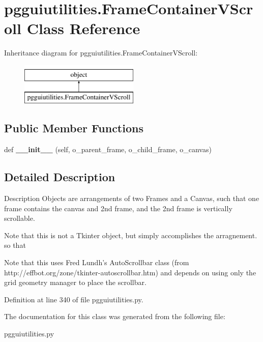 \hypertarget{classpgguiutilities_1_1FrameContainerVScroll}{}\section{pgguiutilities.\+Frame\+Container\+V\+Scroll Class Reference}
\label{classpgguiutilities_1_1FrameContainerVScroll}
Inheritance diagram for pgguiutilities.\+Frame\+Container\+V\+Scroll\+:\begin{figure}[H]
\begin{center}
\leavevmode
\includegraphics[height=2.000000cm]{classpgguiutilities_1_1FrameContainerVScroll}
\end{center}
\end{figure}
\subsection*{Public Member Functions}
\begin{DoxyCompactItemize}
\item 
def {\bfseries \+\_\+\+\_\+init\+\_\+\+\_\+} (self, o\+\_\+parent\+\_\+frame, o\+\_\+child\+\_\+frame, o\+\_\+canvas)\hypertarget{classpgguiutilities_1_1FrameContainerVScroll_a7e9c2478dcb2534f95e1977a82adf831}{}\label{classpgguiutilities_1_1FrameContainerVScroll_a7e9c2478dcb2534f95e1977a82adf831}

\end{DoxyCompactItemize}


\subsection{Detailed Description}
\begin{DoxyVerb}Description
Objects are arrangements of two Frames and a 
Canvas, such that one frame contains the 
canvas and 2nd frame, and the 2nd frame 
is vertically scrollable.

Note that this is not a Tkinter object, but
simply accomplishes the arragnement. so that

Note that this uses Fred Lundh's AutoScrollbar class
(from http://effbot.org/zone/tkinter-autoscrollbar.htm)
and depends on using only the grid geometry manager to place
the scrollbar.
\end{DoxyVerb}
 

Definition at line 340 of file pgguiutilities.\+py.



The documentation for this class was generated from the following file\+:\begin{DoxyCompactItemize}
\item 
pgguiutilities.\+py\end{DoxyCompactItemize}
